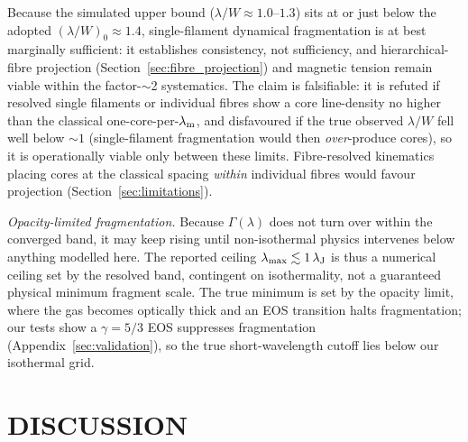 \documentclass[usenatbib,twoside,twocolumn]{mnras}
\begin{document}
Because the simulated upper bound ($\lambda/W\approx1.0$--$1.3$) sits at or just below the adopted $(\lambda/W)_0\approx1.4$, single-filament dynamical fragmentation is at best marginally sufficient: it establishes consistency, not sufficiency, and hierarchical-fibre projection (Section~\ref{sec:fibre_projection}) and magnetic tension remain viable within the factor-$\sim$2 systematics. The claim is falsifiable: it is refuted if resolved single filaments or individual fibres show a core line-density no higher than the classical one-core-per-$\lambda_{\rm m}$, and disfavoured if the true observed $\lambda/W$ fell well below $\sim1$ (single-filament fragmentation would then \emph{over}-produce cores), so it is operationally viable only between these limits. Fibre-resolved kinematics placing cores at the classical spacing \emph{within} individual fibres would favour projection (Section~\ref{sec:limitations}).

\emph{Opacity-limited fragmentation.} Because $\Gamma(\lambda)$ does not turn over within the converged band, it may keep rising until non-isothermal physics intervenes below anything modelled here. The reported ceiling $\lambda_{\rm max}\lesssim1\,\lambda_{\rm J}$ is thus a numerical ceiling set by the resolved band, contingent on isothermality, not a guaranteed physical minimum fragment scale. The true minimum is set by the opacity limit, where the gas becomes optically thick and an EOS transition halts fragmentation; our tests show a $\gamma=5/3$ EOS suppresses fragmentation (Appendix~\ref{sec:validation}), so the true short-wavelength cutoff lies below our isothermal grid.

\section{DISCUSSION}
\label{sec:discussion}
\end{document}
